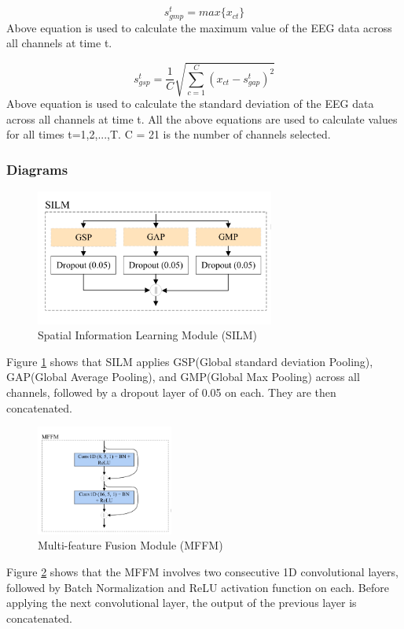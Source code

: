 \documentclass[10pt]{article}
\begin{document}
\[ s_{gmp}^t = max\{x_{ct}\} \]
Above equation is used to calculate the maximum value of the EEG data across all channels at time t.

\[ s_{gsp}^t = \frac{1}{C} \sqrt{\sum_{c=1}^{C} (x_{ct} - s_{gap}^t)^2} \]
Above equation is used to calculate the standard deviation of the EEG data across all channels at time t.
\newline
All the above equations are used to calculate values for all times t=1,2,...,T. C = 21 is the number of channels selected.

\subsubsection{Diagrams}
\begin{figure}[H]
    \centering
    \includegraphics[width=0.7\textwidth]{silm.png}
    \caption{Spatial Information Learning Module (SILM)}
    \label{fig:silm}
\end{figure}
Figure \ref{fig:silm} shows that SILM applies GSP(Global standard deviation Pooling), GAP(Global Average Pooling), and GMP(Global Max Pooling) across all channels, followed by a dropout layer of 0.05 on each. They are then concatenated.

\begin{figure}[H]
    \centering
    \includegraphics[width=0.4\textwidth]{mffm.png}
    \caption{Multi-feature Fusion Module (MFFM)}
    \label{fig:mffm}
\end{figure}
Figure \ref{fig:mffm} shows that the MFFM involves two consecutive 1D convolutional layers, followed by Batch Normalization and ReLU activation function on each. Before applying the next convolutional layer, the output of the previous layer is concatenated.
\end{document}
